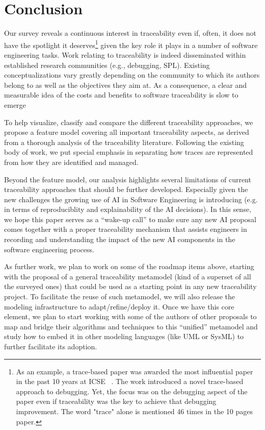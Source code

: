 \section{Conclusion}\label{sec:conclusion}

Our survey reveals a continuous interest in traceability even if, often, it does not have the spotlight it deserves\footnote{As an example, a trace-based paper was awarded the most influential paper in the past 10 years at ICSE ~\cite{ko2008-whyline-debugging}. The work introduced a novel trace-based approach to debugging. Yet, the focus was on the debugging aspect of the paper even if traceability was the key to achieve that debugging improvement. The word "trace" alone is mentioned 46 times in the 10 pages paper.} given the key role it plays in a number of software engineering tasks. Work relating to traceability is indeed disseminated within established research communities (e.g., debugging, SPL). Existing conceptualizations vary greatly depending on the community to which its authors belong to as well as the objectives they aim at. As a consequence, a clear and measurable idea of the costs and benefits to software traceability is slow to emerge

To help visualize, classify and compare the different traceability approaches, we propose a feature model covering all important traceability aspects, as derived from a thorough analysis of the traceability literature. Following the existing body of work, we put special emphasis in separating how traces are represented from how they are identified and managed. 

Beyond the feature model, our analysis highlights several limitations of current traceability approaches that should be further developed. Especially given the new challenges the growing use of AI in Software Engineering \cite{shafiq2020machine,watson2020systematic} is introducing (e.g. in terms of reproduciblity and explainability of the AI decisions). In this sense, we hope this paper serves as a ``wake-up call'' to make sure any new AI proposal comes together with a proper traceability mechanism that assists engineers in recording and understanding the impact of the new AI components in the software engineering process.

As further work, we plan to work on some of the roadmap items above, starting with the proposal of a general traceability metamodel (kind of a superset of all the surveyed ones) that could be used as a starting point in any new traceability project. To facilitate the reuse of such metamodel, we will also release the modeling infrastructure to adapt/refine/deploy it. Once we have this core element, we plan to start working with some of the authors of other proposals to map and bridge their algorithms and techniques to this ``unified'' metamodel and study how to embed it in other modeling languages (like UML or SysML) to further facilitate its adoption.


